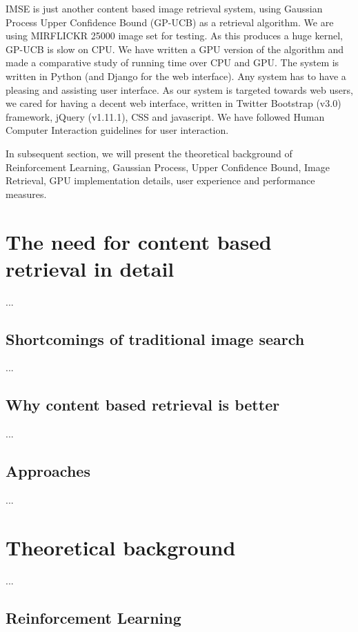 \documentclass[english]{tktltiki}
\begin{document}
IMSE is just another content based image retrieval system, using Gaussian Process Upper Confidence Bound (GP-UCB) as a retrieval algorithm. We are using MIRFLICKR 25000 image set for testing. As this produces a huge kernel, GP-UCB is slow on CPU. We have written a GPU version of the algorithm and made a comparative study of running time over CPU and GPU. The system is written in Python (and Django for the web interface). Any system has to have a pleasing and assisting user interface. As our system is targeted towards web users, we cared for having a decent web interface, written in Twitter Bootstrap (v3.0) framework, jQuery (v1.11.1), CSS and javascript. We have followed Human Computer Interaction guidelines for user interaction.

In subsequent section, we will present the theoretical background of Reinforcement Learning, Gaussian Process, Upper Confidence Bound, Image Retrieval, GPU implementation details, user experience and performance measures.


\section{The need for content based retrieval in detail}

...

\subsection{Shortcomings of traditional image search}

...

\subsection{Why content based retrieval is better}


...


\subsection{Approaches}

...


\section{Theoretical background}

...


\subsection{Reinforcement Learning}
\end{document}
